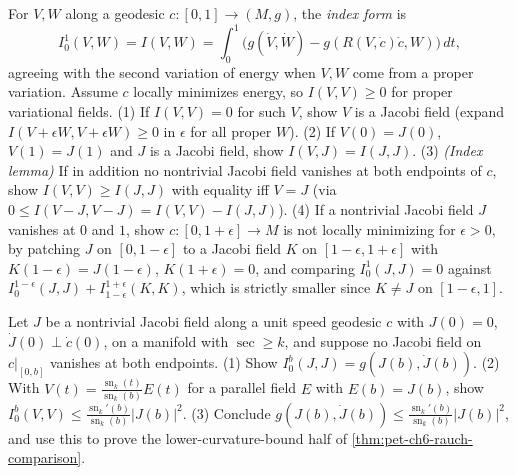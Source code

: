 \begin{remark}
  \label{rem:pet-ch6-ex-6-7-24}
  For $V,W$ along a geodesic $c:[0,1]\to(M,g)$, the \emph{index form} is
  \[
    I_0^1(V,W)=I(V,W)=\int_0^1\big(g(\dot V,\dot W)-g(R(V,\dot c)\dot c,W)\big)\,dt,
  \]
  agreeing with the second variation of energy when $V,W$ come from a proper
  variation. Assume $c$ locally minimizes energy, so $I(V,V)\ge0$ for proper
  variational fields. (1) If $I(V,V)=0$ for such $V$, show $V$ is a Jacobi
  field (expand $I(V+\epsilon W,V+\epsilon W)\ge0$ in $\epsilon$ for all
  proper $W$). (2) If $V(0)=J(0)$, $V(1)=J(1)$ and $J$ is a Jacobi field,
  show $I(V,J)=I(J,J)$. (3) \emph{(Index lemma)} If in addition no nontrivial
  Jacobi field vanishes at both endpoints of $c$, show $I(V,V)\ge I(J,J)$
  with equality iff $V=J$ (via $0\le I(V-J,V-J)=I(V,V)-I(J,J)$). (4) If a
  nontrivial Jacobi field $J$ vanishes at $0$ and $1$, show
  $c:[0,1+\epsilon]\to M$ is not locally minimizing for $\epsilon>0$, by
  patching $J$ on $[0,1-\epsilon]$ to a Jacobi field $K$ on $[1-\epsilon,
  1+\epsilon]$ with $K(1-\epsilon)=J(1-\epsilon)$, $K(1+\epsilon)=0$, and
  comparing $I_0^1(J,J)=0$ against $I_0^{1-\epsilon}(J,J)+I_{1-\epsilon}^{1+
  \epsilon}(K,K)$, which is strictly smaller since $K\ne J$ on
  $[1-\epsilon,1]$.
\end{remark}

\begin{remark}
  \label{rem:pet-ch6-ex-6-7-25}
  Let $J$ be a nontrivial Jacobi field along a unit speed geodesic $c$ with
  $J(0)=0$, $\dot J(0)\perp\dot c(0)$, on a manifold with $\sec\ge k$, and
  suppose no Jacobi field on $c|_{[0,b]}$ vanishes at both endpoints. (1)
  Show $I_0^b(J,J)=g(J(b),\dot J(b))$. (2) With $V(t)=\frac{\operatorname{sn}_k(t)}
  {\operatorname{sn}_k(b)}E(t)$ for a parallel field $E$ with $E(b)=J(b)$, show
  $I_0^b(V,V)\le\frac{\operatorname{sn}_k'(b)}{\operatorname{sn}_k(b)}|J(b)|^2$. (3) Conclude
  $g(J(b),\dot J(b))\le\frac{\operatorname{sn}_k'(b)}{\operatorname{sn}_k(b)}|J(b)|^2$, and use this to
  prove the lower-curvature-bound half of
  \cref{thm:pet-ch6-rauch-comparison}.
\end{remark}

